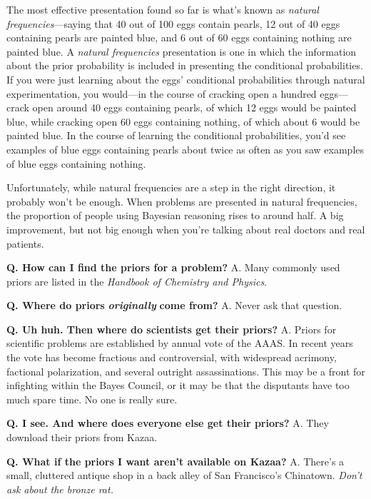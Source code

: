 {
 The most effective presentation found so far is
what's known as \textit{natural frequencies}{}---saying
that 40 out of 100 eggs contain pearls, 12 out of 40 eggs containing
pearls are painted blue, and 6 out of 60 eggs containing nothing are
painted blue. A \textit{natural frequencies} presentation is one in
which the information about the prior probability is included in
presenting the conditional probabilities. If you were just learning
about the eggs' conditional probabilities through
natural experimentation, you would---in the course of cracking open a
hundred eggs---crack open around 40 eggs containing pearls, of which 12
eggs would be painted blue, while cracking open 60 eggs containing
nothing, of which about 6 would be painted blue. In the course of
learning the conditional probabilities, you'd see
examples of blue eggs containing pearls about twice as often as you saw
examples of blue eggs containing nothing.}

{
 Unfortunately, while natural frequencies are a step in the right
direction, it probably won't be enough. When problems
are presented in natural frequencies, the proportion of people using
Bayesian reasoning rises to around half. A big improvement, but not big
enough when you're talking about real doctors and real
patients.}

{
 \textbf{Q. How can I find the priors for a problem?}\newline
 A. Many commonly used priors are listed in the \textit{Handbook of
Chemistry and Physics}.}

{
 \textbf{Q. Where do priors }\textbf{\textit{originally}}\textbf{
come from?}\newline
 A. Never ask that question.}

{
 \textbf{Q. Uh huh. Then where do scientists get their
priors?}\newline
 A. Priors for scientific problems are established by annual vote of the
AAAS. In recent years the vote has become fractious and controversial,
with widespread acrimony, factional polarization, and several outright
assassinations. This may be a front for infighting within the Bayes
Council, or it may be that the disputants have too much spare time. No
one is really sure.}

{
 \textbf{Q. I see. And where does everyone else get their
priors?}\newline
 A. They download their priors from Kazaa.}

{
 \textbf{Q. What if the priors I want aren't
available on Kazaa?}\newline
 A. There's a small, cluttered antique shop in a back
alley of San Francisco's Chinatown.
\textit{Don't ask about the bronze rat.}}

